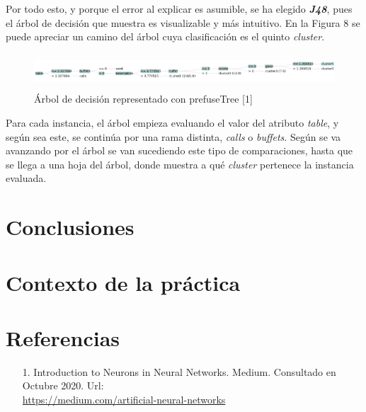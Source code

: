 \documentclass[12pt,a4paper, xcolor=table]{article}
\begin{document}
\vspace{2mm}

Por todo esto, y porque el error al explicar es asumible, se ha elegido \textit{\textbf{J48}}, pues el árbol de decisión que muestra es visualizable y más intuitivo. En la Figura 8 se puede apreciar un camino del árbol cuya clasificación es el quinto \textit{cluster}.

\begin{figure}[!h]
  \centering
  \includegraphics[width=500px, height=50px]{img/arbol_decision.png}
  \caption{Árbol de decisión representado con prefuseTree [1]}
\end{figure}

Para cada instancia, el árbol empieza evaluando el valor del atributo \textit{table}, y según sea este, se continúa por una rama distinta, \textit{calls} o \textit{buffets}. Según se va avanzando por el árbol se van sucediendo este tipo de comparaciones, hasta que se llega a una hoja del árbol, donde muestra a qué \textit{cluster} pertenece la instancia evaluada.

\section{Conclusiones}

\section{Contexto de la práctica}


\clearpage

\section{Referencias}
    \begin{itemize}
        \item [1.] Introduction to Neurons in Neural Networks. Medium. Consultado en Octubre 2020. Url: \\
        \href{https://medium.com/artificial-neural-networks/introduction-to-neurons-in-neural-networks-71828d040a65}{https://medium.com/artificial-neural-networks}
    \end{itemize}
\printindex
\end{document}
